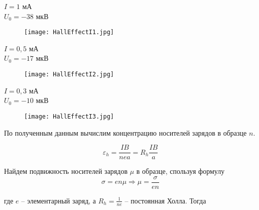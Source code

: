     \newpage
    \begin{center}
        $I = 1$    мА  \\
        $U_0 = -38$ мкВ \\
    \end{center}
    
    \begin{figure}[h!]
        \centering
        \texttt{[image: HallEffectI1.jpg]}
        \caption{}
    \end{figure}
    \newpage
    \begin{center}
        $I = 0,5$    мА  \\
        $U_0 = -17$ мкВ \\
    \end{center}
    
    \begin{figure}[h!]
        \centering
        \texttt{[image: HallEffectI2.jpg]}
        \caption{}
    \end{figure}
    \newpage
    \begin{center}
        $I = 0,3$    мА  \\
        $U_0 = -10$ мкВ \\
    \end{center}
    
    \begin{figure}[h!]
        \centering
        \texttt{[image: HallEffectI3.jpg]}
        \caption{}
    \end{figure}
    \noindent По полученным данным вычислим концентрацию носителей зарядов в образце $n$.

    \begin{equation*}
        \varepsilon_h = \frac{I B}{n e a} = R_h \frac{I B}{a}
    \end{equation*}

    \noindent Найдем подвижность носителей зарядов $\mu$ в образце, спользуя формулу
    \begin{equation*}
        \sigma = e n \mu \Rightarrow \mu = \frac{\sigma}{e n}
    \end{equation*}

    \noindent где $e$ -- элементарный заряд, а $R_h = \frac{1}{n e}$ -- постоянная Холла. Тогда

    

